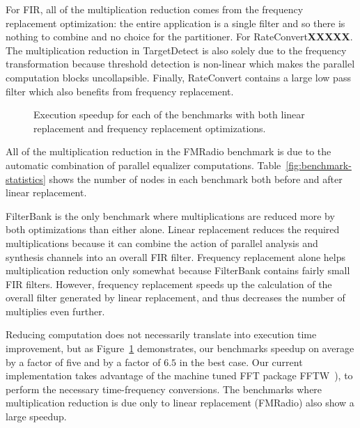 For FIR, all of the multiplication reduction comes from the
frequency replacement optimization: the entire application is
a single filter and so there is nothing to combine and no choice
for the partitioner.
For RateConvert{\bf XXXXX}.
The multiplication reduction in TargetDetect is
also solely due to the frequency transformation because threshold
detection is non-linear which makes the parallel computation blocks
uncollapsible. Finally, RateConvert contains a large low pass filter
which also benefits from frequency replacement.


\begin{figure}[t]
\center
\epsfxsize=3.2in
\vspace{-6pt}
\caption{Execution speedup for each of the benchmarks with both linear replacement and frequency replacement optimizations.}
\label{fig:execution-speedup}
\vspace{-6pt}
\end{figure}

All of the multiplication reduction in the FMRadio benchmark is due to
the automatic combination of parallel equalizer computations.
Table~\ref{fig:benchmark-statistics} shows the number of nodes in each
benchmark both before and after linear replacement.

FilterBank is the only benchmark where multiplications are reduced  
more by both optimizations than either alone. Linear replacement reduces
the required multiplications because it can combine the action of parallel analysis 
and synthesis channels into an overall FIR filter. Frequency replacement alone helps 
multiplication reduction only somewhat because FilterBank contains fairly small FIR filters.
However, frequency replacement speeds up the calculation of the overall filter
generated by linear replacement, and thus decreases the number of multiplies even further.

Reducing computation does not necessarily translate into execution time improvement, but as
Figure~\ref{fig:execution-speedup} demonstrates, our benchmarks speedup on average by a factor of five 
and by a factor of $6.5$ in the best case. Our current implementation takes advantage of the machine tuned 
FFT package FFTW~\cite{frigo99fast}), to perform the necessary time-frequency conversions. 
The benchmarks where multiplication reduction is due only to linear replacement (FMRadio) 
also show a large speedup.


